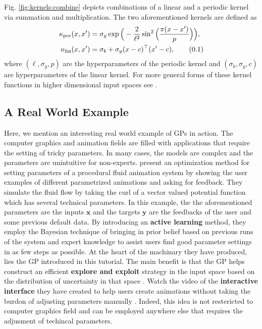 \documentclass[10pt]{article}
\theoremstyle{definition}
\theoremstyle{definition}
\theoremstyle{remark}
\newcommand\eqnum{\addtocounter{equation}{1}\tag{\arabic{section}.\arabic{equation}}}
\begin{document}
Fig. \ref{fig:kernels:combine} depicts combinations of a linear and a periodic kernel via summation and multiplication. The two aforementioned kernels are defined as
\begin{align*}
\kappa_{\text{per}}(x,x') &= \sigma_y\exp\Big(-\frac{2}{\ell^2}\sin^2\Big(\frac{\pi( x-x')}{p}\Big)\Big), \\
\kappa_{\text{lin}}(x, x') &= \sigma_b+\sigma_y(x-c)^{\top}(x'-c),
\eqnum
\end{align*}
where $(\ell, \sigma_y, p)$ are the hyperparameters of the periodic kernel and $(\sigma_b, \sigma_y, c)$ are hyperparameters of the linear kernel. For more general forms of these kernel functions in higher dimensional input spaces see \cite[Section 45.4]{MacKay2003}.
\subsection{A Real World Example}
Here, we mention an interesting real world example of GPs in action. The computer graphics and animation fields are filled with applications that require the setting of tricky parameters. In many cases, the models are complex and the parameters are unintuitive for non-experts. \citeauthor{Brochu2010} \cite{Brochu2010} present an optimization method for setting parameters of a procedural fluid animation system by showing the user examples of different parametrized animations and asking for feedback. They simulate the fluid flow by taking the curl of a vector valued potential function which has several technical parameters. In this example, the the aforementioned parameters are the inputs $\mathbf{x}$ and the targets $\mathbf{y}$ are the feedbacks of the user and some previous default data. By introducing an \textbf{active learning} method, they employ the Bayesian technique of bringing in prior belief based on previous runs of the system and expert knowledge to assist users find good parameter settings in as few steps as possible. At the heart of the machinary they have produced, lies the GP introduced in this tutorial. The main benefit is that the GP helps construct an efficient \textbf{explore and exploit} strategy in the input space based on the distribution of uncertainty in that space \cite[Lecture 9]{Freitas2013}. Watch the video of the \textbf{interactive interface} they have created to help users create animations without taking the burdon of adjusting parameters manually \cite{Brochu2010Animation}. Indeed, this idea is not restericted to computer graphics field and can be employed anywhere else that requires the adjusment of techincal parameters.
\end{document}
